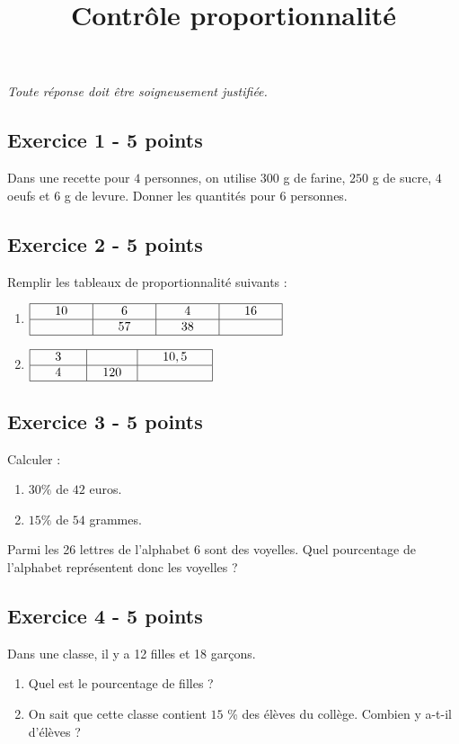 \documentclass[14 pt]{extarticle}
\title{Contrôle proportionnalité}
\date{}
\theoremstyle{plain}
\begin{document}
\emph{Toute réponse doit être soigneusement justifiée.}
 \subsection*{Exercice 1 - 5 points}
 Dans une recette pour $4$ personnes, on utilise $300$ g de farine, $250$ g de sucre, $4$ oeufs et $6$ g de levure. 
 Donner les quantités pour $6$ personnes. 
 \subsection*{Exercice 2 - 5 points}
 Remplir les tableaux de proportionnalité suivants : 
 \begin{enumerate}
 \item 
 $\renewcommand{\arraystretch}{1}
\begin{array}{|c|c|c|c|}
\hline
\phantom{000}10\phantom{000} & \phantom{000}6\phantom{000} & \phantom{000}4\phantom{000}& \phantom{000}16\phantom{000}\\
\hline
\phantom{000}\phantom{000} & \phantom{000}57\phantom{000} & \phantom{000}38\phantom{000}& \phantom{000}\phantom{000}\\
\hline
\end{array}
\renewcommand{\arraystretch}{1}$
\item $\renewcommand{\arraystretch}{1}
\begin{array}{|c|c|c|}
\hline
\phantom{000}3\phantom{000} & \phantom{000}\phantom{000} & \phantom{000}10,5\phantom{000}\\
\hline
4 & 120 & \\
\hline
\end{array}
\renewcommand{\arraystretch}{1}$
 \end{enumerate}
 \subsection*{Exercice 3 - 5 points}
 Calculer : \begin{enumerate}
 \item $30\%$ de $42$ euros. 
 \item $15\%$ de $54$ grammes. 
 \end{enumerate}
 Parmi les 26 lettres de l'alphabet $6$ sont des voyelles. Quel pourcentage de l'alphabet représentent donc les voyelles ?  
 \subsection*{Exercice 4 - 5 points}
Dans une classe, il y  a 12 filles et 18 garçons.
\begin{enumerate}
\item  Quel est le pourcentage de filles ?
\item On sait que cette classe contient $15$ \% des élèves du collège. Combien y a-t-il d'élèves ? 
\end{enumerate}

 	
\end{document}
